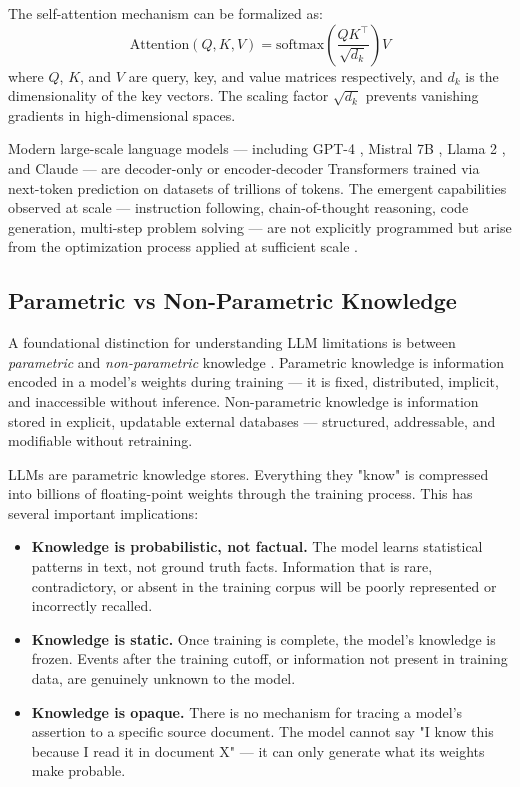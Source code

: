 The self-attention mechanism can be formalized as:
\begin{equation}
  \text{Attention}(Q, K, V) = \text{softmax}\left(\frac{QK^\top}{\sqrt{d_k}}\right)V
  \label{eq:attention}
\end{equation}
where $Q$, $K$, and $V$ are query, key, and value matrices respectively, and $d_k$ is the dimensionality of the key vectors. The scaling factor $\sqrt{d_k}$ prevents vanishing gradients in high-dimensional spaces.

Modern large-scale language models — including GPT-4 \citep{OpenAI2023}, Mistral 7B \citep{Jiang2023}, Llama 2 \citep{Touvron2023}, and Claude \citep{Anthropic2023} — are decoder-only or encoder-decoder Transformers trained via next-token prediction on datasets of trillions of tokens. The emergent capabilities observed at scale — instruction following, chain-of-thought reasoning, code generation, multi-step problem solving — are not explicitly programmed but arise from the optimization process applied at sufficient scale \citep{Wei2022}.

\subsection{Parametric vs Non-Parametric Knowledge}

A foundational distinction for understanding LLM limitations is between \textit{parametric} and \textit{non-parametric} knowledge \citep{Lewis2020}. Parametric knowledge is information encoded in a model's weights during training — it is fixed, distributed, implicit, and inaccessible without inference. Non-parametric knowledge is information stored in explicit, updatable external databases — structured, addressable, and modifiable without retraining.

LLMs are parametric knowledge stores. Everything they "know" is compressed into billions of floating-point weights through the training process. This has several important implications:

\begin{itemize}
  \item \textbf{Knowledge is probabilistic, not factual.} The model learns statistical patterns in text, not ground truth facts. Information that is rare, contradictory, or absent in the training corpus will be poorly represented or incorrectly recalled.
  \item \textbf{Knowledge is static.} Once training is complete, the model's knowledge is frozen. Events after the training cutoff, or information not present in training data, are genuinely unknown to the model.
  \item \textbf{Knowledge is opaque.} There is no mechanism for tracing a model's assertion to a specific source document. The model cannot say "I know this because I read it in document X" — it can only generate what its weights make probable.
\end{itemize}

